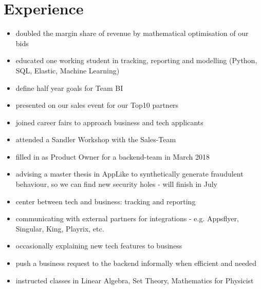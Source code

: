 \documentclass[a4paper]{twentysecondcv} %
\begin{document}
\section{Experience}

\begin{twenty} %
	{ 
    \begin{itemize}
    \item doubled the margin share of revenue by mathematical optimisation of our bids
    \item educated one working student in tracking, reporting and modelling (Python, SQL, Elastic, Machine Learning)
    \item define half year goals for Team BI
    \item presented on our sales event for our Top10 partners 
    \item joined career fairs to approach business and tech applicants
    \item attended a Sandler Workshop with the Sales-Team
    \item filled in as Product Owner for a backend-team in March 2018

    \item advising a master thesis in AppLike to synthetically generate fraudulent
    behaviour, so we can find new security holes - will finish in July 
    \end{itemize}
    }
   	{
    \begin{itemize}
    \item center between tech and business: tracking and reporting 
    \item communicating with external partners for integrations - e.g. Appsflyer, Singular, King, Playrix, etc.
    \item occasionally explaining new tech features to business
    \item push a business request to the backend informally when efficient and needed
    \end{itemize}
    }
	{
    \begin{itemize}
    \item instructed classes in Linear Algebra, Set Theory, Mathematics for Physicist
    \end{itemize}
    }
\end{twenty}
\end{document}
